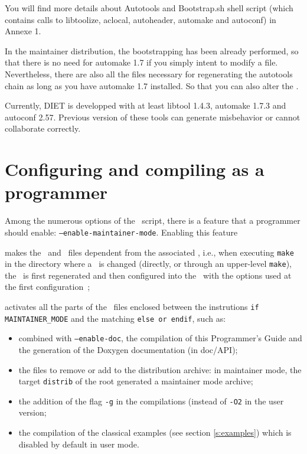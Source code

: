 
You will find more details about Autotools and Bootstrap.sh shell script 
(which contains calls to libtoolize, aclocal, autoheader, automake and 
autoconf) in Annexe 1.


\noindent
{} In the maintainer distribution, the bootstrapping has been already
performed, so that there is no need for \textsf{automake 1.7} if you simply
intent to modify a file. Nevertheless, there are also all the files necessary
for regenerating the autotools chain as long as you have \textsf{automake 1.7}
installed. So that you can also alter the \makeam.

\noindent
{} Currently, DIET is developped with at least libtool 1.4.3,
automake 1.7.3 and autoconf 2.57. Previous version of these tools can generate
misbehavior or cannot collaborate correctly.

\section{Configuring and compiling as a programmer}

Among the numerous options of the \configure\ script, there is a feature that
a programmer should enable: \texttt{--enable-maintainer-mode}. Enabling this feature
\begin{description}
\item{}makes the \make\ and \makein\ files dependent from the associated \makeam,
    i.e., when executing \texttt{make} in the directory where a \makeam\ is
    changed (directly, or through an upper-level \texttt{make}), the \makein\ is
    first regenerated and then configured into the \make\ with the options used
    at the first configuration~;
\item{}activates all the parts of the \makeam\ files enclosed between the
    instrutions \texttt{\footnotesize if MAINTAINER\_MODE} and the matching
    \texttt{\footnotesize else or endif}, such as:
    \begin{itemize}
    \item{combined with \texttt{--enable-doc}, the compilation of this
        Programmer's Guide and the generation of the Doxygen documentation (in
        doc/API);}
    \item{the files to remove or add to the distribution archive: in maintainer
        mode, the target \texttt{distrib} of the root \make generated a
        maintainer mode archive;}
    \item{the addition of the flag \texttt{-g} in the compilations (instead of
        \texttt{-O2} in the user version;}
    \item{the compilation of the classical examples (see section
        \ref{s:examples}) which is disabled by default in user mode.}
    \end{itemize}
\end{description}

